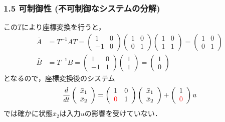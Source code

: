 \documentclass[10pt]{beamer}
\begin{document}
\begin{frame}[t]
\frametitle{1.5 可制御性 (不可制御なシステムの分解)}
この$T$により座標変換を行うと，
\begin{align}
 \bar{A} &= T^{-1}AT =
 \left(
 \begin{array}{cc}
  1 & 0 \\
  -1 & 0
 \end{array}
 \right)
 \left(
 \begin{array}{cc}
  1 & 0 \\
  0 & 1
 \end{array}
 \right)
 \left(
 \begin{array}{cc}
  1 & 0 \\
  1 & 1
 \end{array}
 \right) =
 \left(
 \begin{array}{cc}
  1 & 0 \\
  0 & 1
 \end{array}
 \right) \\
 \bar{B} &= T^{-1}B =
 \left(
 \begin{array}{cc}
  1 & 0 \\
  -1 & 1
 \end{array}
 \right)
 \left(
 \begin{array}{c}
  1 \\
  1
 \end{array}
 \right) =
 \left(
 \begin{array}{c}
  1 \\
  0
 \end{array}
 \right)
\end{align}
となるので，座標変換後のシステム
\begin{equation}
 \frac{d}{dt}
  \left(
   \begin{array}{c}
    \bar{x}_1 \\
    \bar{x}_2
   \end{array}
  \right) =
  \left(
   \begin{array}{cc}
    1 & 0 \\
    \textcolor{red}{0} & 1
   \end{array}
  \right)
  \left(
   \begin{array}{c}
    \bar{x}_1 \\
    \bar{x}_2
   \end{array}
  \right) +
  \left(
   \begin{array}{c}
    1 \\
    \textcolor{red}{0}
   \end{array}
  \right) u
\end{equation}
では確かに状態$\bar{x}_2$は入力$u$の影響を受けていない．
\end{frame}
\end{document}
